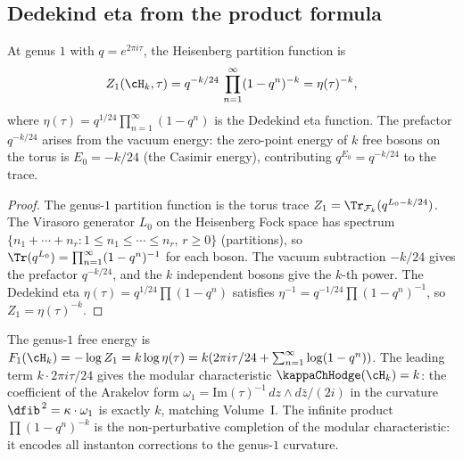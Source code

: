 \subsection{Dedekind eta from the product formula}

\begin{corollary}
At genus $1$ with $q = e^{2\pi i\tau}$, the Heisenberg partition
function is
\begin{equation}
Z_1(\cH_k, \tau)
= q^{-k/24}\, \prod_{n=1}^\infty (1 - q^n)^{-k}
= \eta(\tau)^{-k},
\end{equation}
where $\eta(\tau) = q^{1/24} \prod_{n=1}^\infty (1 - q^n)$ is the
Dedekind eta function. The prefactor $q^{-k/24}$ arises from the
vacuum energy: the zero-point energy of $k$ free bosons on the
torus is $E_0 = -k/24$ \textup{(}the Casimir
energy\textup{)}, contributing $q^{E_0} = q^{-k/24}$ to the
trace.
\end{corollary}

\begin{proof}
The genus-$1$ partition function is the torus trace
$Z_1 = \Tr_{\mathcal{F}_k}(q^{L_0 - k/24})$. The Virasoro
generator $L_0$ on the Heisenberg Fock space has spectrum
$\{n_1 + \cdots + n_r : 1 \le n_1 \le \cdots \le n_r,\,
r \ge 0\}$ (partitions), so
$\Tr(q^{L_0}) = \prod_{n=1}^\infty (1-q^n)^{-1}$ for each
boson. The vacuum subtraction $-k/24$ gives the prefactor
$q^{-k/24}$, and the $k$ independent bosons give the $k$-th
power. The Dedekind eta $\eta(\tau) = q^{1/24}\prod(1-q^n)$
satisfies $\eta^{-1} = q^{-1/24}\prod(1-q^n)^{-1}$, so
$Z_1 = \eta(\tau)^{-k}$.
\end{proof}

\begin{remark}
The genus-$1$ free energy is
$F_1(\cH_k) = -\log Z_1 = k\log\eta(\tau) = k(2\pi i\tau/24 +
\sum_{n=1}^\infty \log(1-q^n))$. The leading term
$k\cdot 2\pi i\tau/24$ gives the modular characteristic
$\kappaChHodge(\cH_k) = k$: the coefficient of the Arakelov form
$\omega_1 = \mathrm{Im}(\tau)^{-1}\, dz \wedge d\bar{z}/(2i)$
in the curvature $\dfib^{\,2} = \kappa \cdot \omega_1$ is
exactly $k$, matching Volume~I. The infinite product
$\prod(1-q^n)^{-k}$ is the non-perturbative completion of
the modular characteristic: it encodes all instanton corrections
to the genus-$1$ curvature.
\end{remark}

